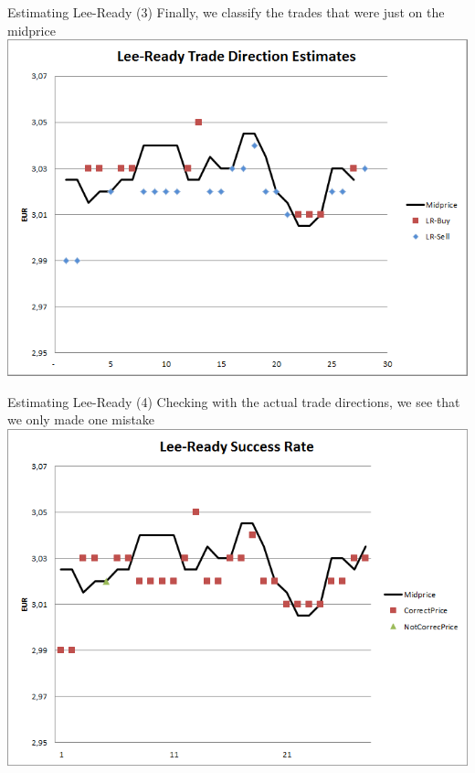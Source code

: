 \documentclass[english,10pt]{beamer}
\begin{document}
\begin{frame}{Estimating Lee-Ready (3)}
	Finally, we classify the trades that were just on the midprice
	\center
	\includegraphics[scale=0.39]{pics/L2_leereadyest}
\end{frame}


\begin{frame}{Estimating Lee-Ready (4)}
	Checking with the actual trade directions, we see that we only made one mistake
	\center
	\includegraphics[scale=0.39]{pics/L2_leereadysuccess}
\end{frame}
\end{document}
